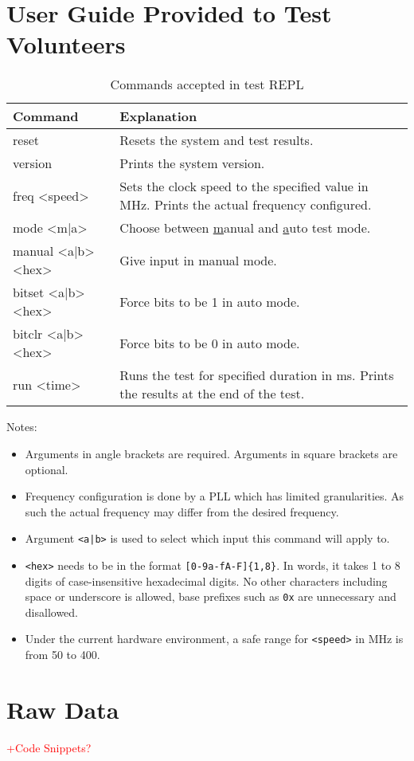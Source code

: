 \chapter{User Guide Provided to Test Volunteers}

\begin{table}[H]
  \centering
  \begin{tabular}{|>{\ttfamily}p{11em}|p{\dimexpr\textwidth-18em}|}
    \hline
    \textrm{Command}   & Explanation \\
    \hline
    reset              & Resets the system and test results. \\
    version            & Prints the system version. \\
    freq <speed>       & Sets the clock speed to the specified value in MHz. Prints the actual frequency configured. \\
    mode <m|a>         & Choose between \underline{m}anual and \underline{a}uto test mode. \\
    manual <a|b> <hex>  & Give input in manual mode. \\
    bitset <a|b> <hex>  & Force bits to be 1 in auto mode. \\
    bitclr <a|b> <hex>  & Force bits to be 0 in auto mode. \\
    run <time>         & Runs the test for specified duration in ms. Prints the results at the end of the test. \\
    \hline
  \end{tabular}
  \caption{Commands accepted in test REPL}
\end{table}

Notes:
\begin{itemize}
  \item Arguments in angle brackets are required. Arguments in square brackets are optional.
  \item Frequency configuration is done by a PLL which has limited granularities. As such the actual frequency may differ from the desired frequency.
  \item Argument \texttt{<a|b>} is used to select which input this command will apply to.
  \item \texttt{<hex>} needs to be in the format \texttt{[0-9a-fA-F]\{1,8\}}. In words, it takes 1 to 8 digits of case-insensitive hexadecimal digits. No other characters including space or underscore is allowed, base prefixes such as \texttt{0x} are unnecessary and disallowed.
  \item Under the current hardware environment, a safe range for \texttt{<speed>} in MHz is from 50 to 400.
\end{itemize}


\chapter{Raw Data}

\textcolor{red}{+Code Snippets?}
